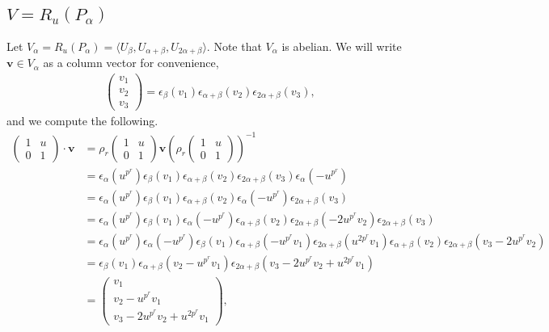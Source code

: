 \subsection{$V = R_u(P_\alpha)$}
\label{b2:alpha}

Let $V_\alpha=R_u(P_\alpha)=\langle U_\beta, U_{\alpha + \beta}, U_{2\alpha + \beta} \rangle$. Note that $V_\alpha$ is abelian.
We will write $\mathbf{v}\in V_\alpha$ as a column vector for convenience,
\begin{align*}
	\left(\begin{matrix}v_1\\v_2\\v_3\end{matrix}\right) = \epsilon_\beta(v_1)\epsilon_{\alpha+\beta}(v_2)\epsilon_{2\alpha+\beta}(v_3),
\end{align*}
and we compute the following.
\begin{align*}
\left(\begin{matrix} 1 & u \\ 0 & 1\end{matrix}\right) \cdot \mathbf{v} 
&= 
\rho_r\left(\begin{matrix} 1 & u \\ 0 & 1\end{matrix}\right) \mathbf{v}\left( \rho_r\left(\begin{matrix} 1 & u \\ 0 & 1\end{matrix}\right)\right)^{-1} \\
&=
\epsilon_ \alpha (u^{p^r}) \epsilon_ \beta (v_1)\epsilon_{\alpha+\beta}(v_2) \epsilon_{2\alpha+\beta}(v_3) \epsilon_ \alpha (-u^{p^r}) \\
&=
\epsilon_ \alpha (u^{p^r}) \epsilon_ \beta (v_1) \epsilon_{\alpha+\beta}(v_2) \epsilon_ \alpha (-u^{p^r}) \epsilon_{2\alpha+\beta}(v_3) \\
&=
\epsilon_ \alpha (u^{p^r}) \epsilon_ \beta (v_1)  \epsilon_ \alpha (-u^{p^r}) \epsilon_{\alpha+\beta}(v_2) \epsilon_{2\alpha+\beta}(-2u^{p^r}v_2)\epsilon_{2\alpha+\beta}(v_3)\\
&=
\epsilon_ \alpha (u^{p^r}) \epsilon_ \alpha (-u^{p^r})  \epsilon_ \beta (v_1) \epsilon_{\alpha+\beta}(-u^{p^r}v_1) \epsilon_{2\alpha+\beta}(u^{2p^r}v_1) \epsilon_{\alpha+\beta}(v_2) \epsilon_{2\alpha+\beta}(v_3-2u^{p^r}v_2)\\
&=
\epsilon_ \beta (v_1)  \epsilon_{\alpha+\beta}(v_2-u^{p^r}v_1) \epsilon_{2\alpha+\beta}(v_3-2u^{p^r}v_2 + u^{2p^r}v_1)\\
&= \left(\begin{matrix} v_1 \\ v_2-u^{p^r}v_1 \\ v_3-2u^{p^r}v_2 + u^{2p^r}v_1 \end{matrix}\right),
\end{align*}
